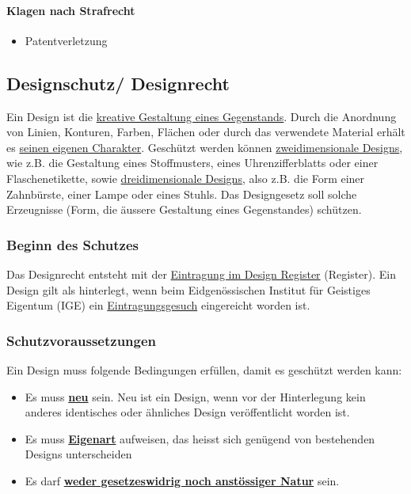 \paragraph{Klagen nach Strafrecht}
\begin{itemize}
    \item Patentverletzung
\end{itemize}

\subsection{Designschutz/ Designrecht}
Ein Design ist die \underline{kreative Gestaltung eines Gegenstands}. Durch die Anordnung von Linien, Konturen, Farben, Flächen oder durch das verwendete Material erhält es \underline{seinen eigenen Charakter}. Geschützt werden können \underline{zweidimensionale Designs}, wie z.B. die Gestaltung eines Stoffmusters, eines Uhrenzifferblatts oder einer Flaschenetikette, sowie \underline{dreidimensionale Designs}, also z.B. die Form einer Zahnbürste, einer Lampe oder eines Stuhls. Das Designgesetz soll solche Erzeugnisse (Form, die äussere Gestaltung eines Gegenstandes) schützen.

\subsubsection{Beginn des Schutzes}
Das Designrecht entsteht mit der \underline{Eintragung im Design Register} (Register). Ein Design gilt als hinterlegt, wenn beim Eidgenössischen Institut für Geistiges Eigentum (IGE) ein \underline{Eintragungsgesuch} eingereicht worden ist.

\subsubsection{Schutzvoraussetzungen}
Ein Design muss folgende Bedingungen erfüllen, damit es geschützt werden kann:
\begin{itemize}
    \item Es muss \textbf{\underline{neu}} sein. Neu ist ein Design, wenn vor der Hinterlegung kein anderes identisches oder ähnliches Design veröffentlicht worden ist.
    \item Es muss \textbf{\underline{Eigenart}} aufweisen, das heisst sich genügend von bestehenden Designs unterscheiden
    \item Es darf \textbf{\underline{weder gesetzeswidrig noch anstössiger Natur}} sein.
\end{itemize}


